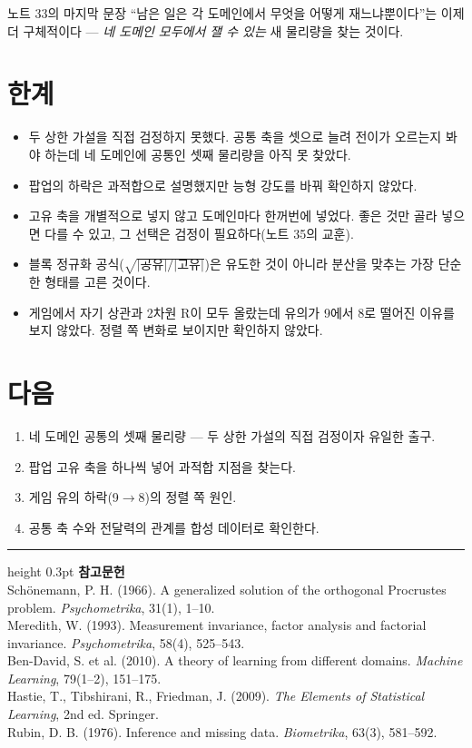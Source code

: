 \documentclass[10pt]{article}
\begin{document}
노트 33의 마지막 문장 ``남은 일은 각 도메인에서 무엇을 어떻게 재느냐뿐이다''는
이제 더 구체적이다 --- \emph{네 도메인 모두에서 잴 수 있는} 새 물리량을 찾는
것이다.

\section{한계}

\begin{itemize}[leftmargin=1.1em,itemsep=0.15em]
\item 두 상한 가설을 직접 검정하지 못했다. 공통 축을 셋으로 늘려 전이가 오르는지
      봐야 하는데 네 도메인에 공통인 셋째 물리량을 아직 못 찾았다.
\item 팝업의 하락은 과적합으로 설명했지만 능형 강도를 바꿔 확인하지 않았다.
\item 고유 축을 개별적으로 넣지 않고 도메인마다 한꺼번에 넣었다. 좋은 것만
      골라 넣으면 다를 수 있고, 그 선택은 검정이 필요하다(노트 35의 교훈).
\item 블록 정규화 공식($\sqrt{|\text{공유}|/|\text{고유}|}$)은 유도한 것이 아니라
      분산을 맞추는 가장 단순한 형태를 고른 것이다.
\item 게임에서 자기 상관과 2차원 R이 모두 올랐는데 유의가 9에서 8로 떨어진
      이유를 보지 않았다. 정렬 쪽 변화로 보이지만 확인하지 않았다.
\end{itemize}

\section{다음}

\begin{enumerate}[leftmargin=1.3em,itemsep=0.15em]
\item 네 도메인 공통의 셋째 물리량 --- 두 상한 가설의 직접 검정이자 유일한 출구.
\item 팝업 고유 축을 하나씩 넣어 과적합 지점을 찾는다.
\item 게임 유의 하락(9$\to$8)의 정렬 쪽 원인.
\item 공통 축 수와 전달력의 관계를 합성 데이터로 확인한다.
\end{enumerate}

\vspace{0.6em}
\hrule height 0.3pt
\vspace{0.5em}
{\footnotesize
\textbf{참고문헌}\\[0.3em]
Schönemann, P. H. (1966). A generalized solution of the orthogonal Procrustes
problem. \emph{Psychometrika}, 31(1), 1--10.\\[0.15em]
Meredith, W. (1993). Measurement invariance, factor analysis and factorial
invariance. \emph{Psychometrika}, 58(4), 525--543.\\[0.15em]
Ben-David, S. et al. (2010). A theory of learning from different domains.
\emph{Machine Learning}, 79(1--2), 151--175.\\[0.15em]
Hastie, T., Tibshirani, R., Friedman, J. (2009). \emph{The Elements of
Statistical Learning}, 2nd ed. Springer.\\[0.15em]
Rubin, D. B. (1976). Inference and missing data. \emph{Biometrika}, 63(3), 581--592.
}
\end{document}
